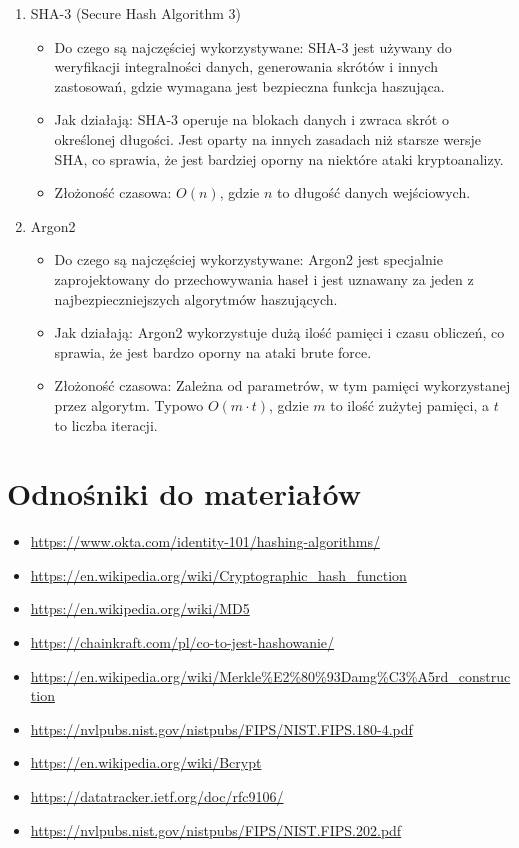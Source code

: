 \documentclass{article}
\begin{document}
\begin{enumerate}
    \item SHA-3 (Secure Hash Algorithm 3)
    \begin{itemize}
        \item[] Do czego są najczęściej wykorzystywane: SHA-3 jest używany do weryfikacji integralności danych, generowania skrótów i innych zastosowań, gdzie wymagana jest bezpieczna funkcja haszująca.
        \\
        \item[] Jak działają: SHA-3 operuje na blokach danych i zwraca skrót o określonej długości. Jest oparty na innych zasadach niż starsze wersje SHA, co sprawia, że jest bardziej oporny na niektóre ataki kryptoanalizy.
        \\
        \item[] Złożoność czasowa: $O(n)$, gdzie $n$ to długość danych wejściowych.
    \end{itemize}
    
    \item Argon2
    \begin{itemize}
        \item[] Do czego są najczęściej wykorzystywane: Argon2 jest specjalnie zaprojektowany do przechowywania haseł i jest uznawany za jeden z najbezpieczniejszych algorytmów haszujących.
        \\
        \item[] Jak działają: Argon2 wykorzystuje dużą ilość pamięci i czasu obliczeń, co sprawia, że jest bardzo oporny na ataki brute force.
        \\
        \item[] Złożoność czasowa: Zależna od parametrów,
        w tym pamięci wykorzystanej przez algorytm.
        Typowo $O(m \cdot t)$, gdzie $m$ to ilość zużytej pamięci, a $t$ to liczba iteracji.
    \end{itemize}
\end{enumerate}

\newpage
\section{Odnośniki do materiałów}
\begin{itemize}
    \item \url{https://www.okta.com/identity-101/hashing-algorithms/}
    \item \url{https://en.wikipedia.org/wiki/Cryptographic_hash_function}
    \item \url{https://en.wikipedia.org/wiki/MD5}
    \item \url{https://chainkraft.com/pl/co-to-jest-hashowanie/}
    \item \url{https://en.wikipedia.org/wiki/Merkle%E2%80%93Damg%C3%A5rd_construction}
    \item \url{https://nvlpubs.nist.gov/nistpubs/FIPS/NIST.FIPS.180-4.pdf}
    \item \url{https://en.wikipedia.org/wiki/Bcrypt}
    \item \url{https://datatracker.ietf.org/doc/rfc9106/}
    \item \url{https://nvlpubs.nist.gov/nistpubs/FIPS/NIST.FIPS.202.pdf}
\end{itemize}
\end{document}
